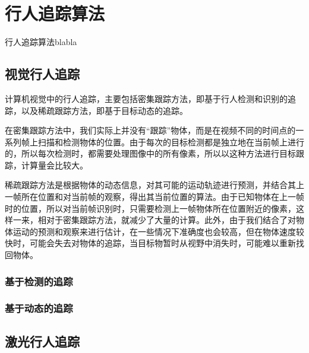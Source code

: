 
\chapter{行人追踪算法}
  行人追踪算法blabla

  
\section{视觉行人追踪}
  计算机视觉中的行人追踪，主要包括密集跟踪方法，即基于行人检测和识别的追踪，以及稀疏跟踪方法，即基于目标动态的追踪。

  在密集跟踪方法中，我们实际上并没有“跟踪”物体，而是在视频不同的时间点的一系列帧上扫描和检测物体的位置。由于每次的目标检测都是独立地在当前帧上进行的，所以每次检测时，都需要处理图像中的所有像素，所以以这种方法进行目标跟踪，计算量会比较大。

  稀疏跟踪方法是根据物体的动态信息，对其可能的运动轨迹进行预测，并结合其上一帧所在位置和对当前帧的观察，得出其当前位置的算法。由于已知物体在上一帧时的位置，所以对当前帧识别时，只需要检测上一帧物体所在位置附近的像素，这样一来，相对于密集跟踪方法，就减少了大量的计算。此外，由于我们结合了对物体运动的预测和观察来进行估计，在一些情况下准确度也会较高，但在物体速度较快时，可能会失去对物体的追踪，当目标物暂时从视野中消失时，可能难以重新找回物体。

\subsection{基于检测的追踪}

\subsection{基于动态的追踪}


\section{激光行人追踪}


